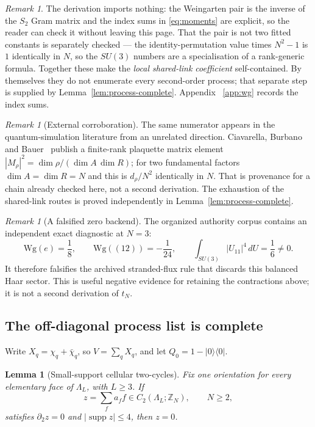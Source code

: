\documentclass[11pt]{article}
\theoremstyle{plain}
\newtheorem{lemma}[theorem]{Lemma}
\theoremstyle{definition}
\theoremstyle{remark}
\newtheorem{remark}[theorem]{Remark}
\newcommand{\chk}[1]{}
\begin{document}
\begin{remark}
The derivation imports nothing: the Weingarten pair is the inverse of the
$S_2$ Gram matrix and the index sums in \eqref{eq:moments} are explicit, so
the reader can check it without leaving this page. That the pair is not two
fitted constants is separately checked --- the identity-permutation value times
$N^2-1$ is $1$ identically in $N$, so the $SU(3)$ numbers are a specialisation
of a rank-generic formula. Together these make the \emph{local shared-link
coefficient} self-contained. By themselves they do not enumerate every
second-order process; that separate step is supplied by
Lemma~\ref{lem:process-complete}. Appendix~%
\ref{app:wg} records the index sums.
\chk{the Weingarten route is independent of the corpus}
\end{remark}

\begin{remark}[External corroboration]
The same numerator appears in the quantum-simulation literature from an
unrelated direction. Ciavarella, Burbano and Bauer~\cite{CBB2025} publish a
finite-rank plaquette matrix element
$|M_\rho|^2=\dim\rho/(\dim A\,\dim R)$; for two fundamental factors
$\dim A=\dim R=N$ and this is $d_\rho/N^2$ identically in $N$. That is
provenance for a chain already checked here, not a second derivation. The
exhaustion of the shared-link routes is proved independently in
Lemma~\ref{lem:process-complete}.
\chk{the published dimension-ratio matrix element is this registry's weight formula}
\end{remark}

\begin{remark}[A falsified zero backend]
The organized authority corpus contains an independent exact diagnostic at
$N=3$:
\[
 \mathrm{Wg}(e)=\frac18,\qquad
 \mathrm{Wg}((12))=-\frac1{24},\qquad
 \int_{SU(3)}|U_{11}|^4\,dU=\frac16\ne0.
\]
It therefore falsifies the archived stranded-flux rule that discards this
balanced Haar sector. This is useful negative evidence for retaining the
contractions above; it is not a second derivation of $t_N$.
\end{remark}

\subsection{The off-diagonal process list is complete}

Write $X_q=\chi_q+\bar\chi_q$, so $V=\sum_qX_q$, and let
$Q_0=1-|0\rangle\langle0|$.

\begin{lemma}[Small-support cellular two-cycles]
\label{lem:small-support-two-cycle}
Fix one orientation for every elementary face of $\Lambda_L$, with $L\ge3$.
If
\[
 z=\sum_f a_ff\in C_2(\Lambda_L;\mathbb Z_N),
 \qquad N\ge2,
\]
satisfies $\partial_2z=0$ and
$|\operatorname{supp}z|\le4$, then $z=0$.
\end{lemma}
\end{document}
